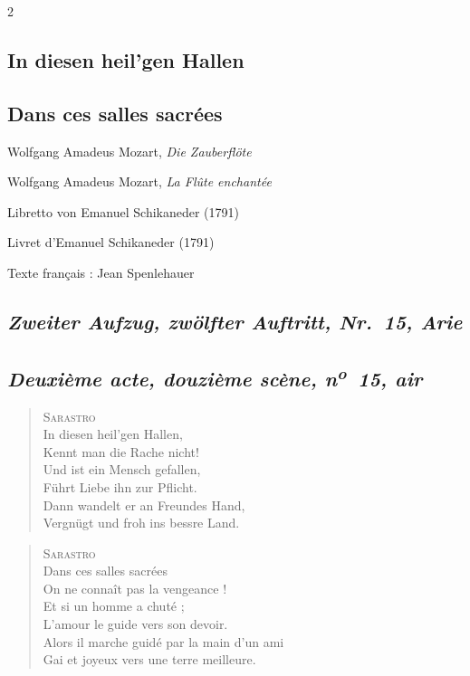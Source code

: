 \documentclass[a4paper,12pt]{article}
\newcommand\chunks[2]{%
\begin{leftcolumn*}\begin{otherlanguage}{german}%
{#1}%
\end{otherlanguage}\end{leftcolumn*}%
\begin{rightcolumn}\begin{otherlanguage}{french}%
{#2}%
\end{otherlanguage}\end{rightcolumn}%
}
\newcommand\strophe[1]{\subsection*{\normalsize\normalfont\itshape #1}}
\begin{document}
\thispagestyle{empty}
\setlength{\columnsep}{8mm}


\begin{paracol}{2}

  \chunks{\section*{In diesen heil’gen Hallen}}
         {\section*{Dans ces salles sacrées}}

  \chunks{\noindent\raggedright\small Wolfgang Amadeus Mozart, \textit{Die Zauberflöte}}
         {\noindent\raggedright\small Wolfgang Amadeus Mozart, \textit{La Flûte enchantée}}

  \chunks{\noindent\raggedright\small Libretto von Emanuel Schikaneder (1791)}
         {\noindent\raggedright\small Livret d’Emanuel Schikaneder (1791)}

  \chunks{}
         {\noindent\raggedright\small Texte français : Jean Spenlehauer}

  \chunks{\strophe{Zweiter Aufzug, zwölfter Auftritt, Nr.~15, Arie}}
         {\strophe{Deuxième acte, douzième scène, n\textsuperscript{o}~15, air}}

  \chunks{\begin{verse}
          \textsc{Sarastro}\\[\medskipamount]
          In diesen heil’gen Hallen,\\
          Kennt man die Rache nicht!\\
          Und ist ein Mensch gefallen,\\
          Führt Liebe ihn zur Pflicht.\\
          Dann wandelt er an Freundes Hand,\\
          Vergnügt und froh ins bessre Land.
          \end{verse}}
         {\begin{verse}
          \textsc{Sarastro}\\[\medskipamount]
          Dans ces salles sacrées\\
          On ne connaît pas la vengeance !\\
          Et si un homme a chuté ;\\
          L’amour le guide vers son devoir.\\
          Alors il marche guidé par la main d’un ami\\
          Gai et joyeux vers une terre meilleure.
          \end{verse}}


\end{paracol}
\end{document}
